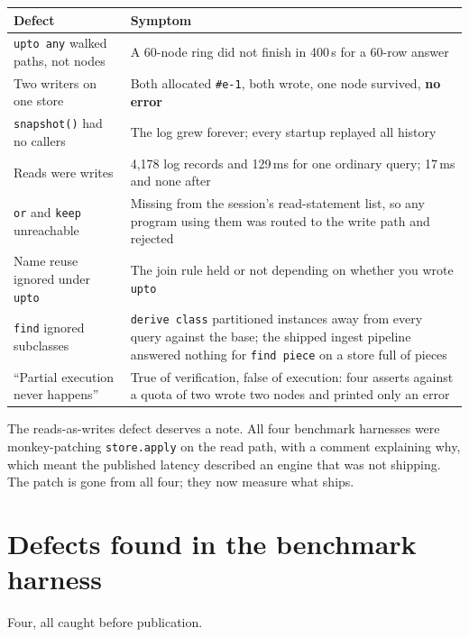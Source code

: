 \documentclass[11pt]{article}
\begin{document}
\begin{center}
\small
\begin{tabular}{p{}p{}}
\toprule
Defect & Symptom \\
\midrule
\texttt{upto any} walked paths, not nodes & A 60-node ring did not finish in 400\,s for a 60-row answer \\
Two writers on one store & Both allocated \texttt{\#e-1}, both wrote, one node survived, \textbf{no error} \\
\texttt{snapshot()} had no callers & The log grew forever; every startup replayed all history \\
Reads were writes & 4{,}178 log records and 129\,ms for one ordinary query; 17\,ms and none after \\
\texttt{or} and \texttt{keep} unreachable & Missing from the session's read-statement list, so any program using them was routed to the write path and rejected \\
Name reuse ignored under \texttt{upto} & The join rule held or not depending on whether you wrote \texttt{upto} \\
\texttt{find} ignored subclasses & \texttt{derive class} partitioned instances away from every query against the base; the shipped ingest pipeline answered nothing for \texttt{find piece} on a store full of pieces \\
``Partial execution never happens'' & True of verification, false of execution: four asserts against a quota of two wrote two nodes and printed only an error \\
\bottomrule
\end{tabular}
\end{center}

The reads-as-writes defect deserves a note. All four benchmark harnesses were
monkey-patching \texttt{store.apply} on the read path, with a comment explaining
why, which meant the published latency described an engine that was not shipping.
The patch is gone from all four; they now measure what ships.

\section{Defects found in the benchmark harness}

Four, all caught before publication.
\end{document}
